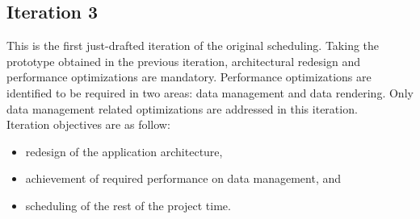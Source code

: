 		\subsection{Iteration 3}

			This is the first just-drafted iteration of the original scheduling. Taking the prototype obtained in the previous iteration, architectural redesign and performance optimizations are mandatory. Performance optimizations are  identified to be required in two areas: data management and data rendering. Only data management related optimizations are addressed in this iteration.\\

			Iteration objectives are as follow:
			\begin{itemize} 
				\item redesign of the application architecture, 
				\item achievement of required performance on data management, and
				\item scheduling of the rest of the project time.
			\end{itemize}

